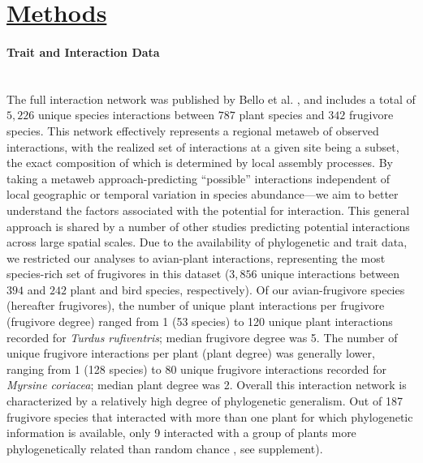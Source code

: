 \section*{\textbf{\underline{Methods}}}

\paragraph*{Trait and Interaction Data}\mbox{}\\
The full interaction network was published by Bello et al. \parencite{bello2017}, and includes a total of $5,226$ unique species interactions between $787$ plant species and $342$ frugivore species. This network effectively represents a regional metaweb of observed interactions, with the realized set of interactions at a given site being a subset, the exact composition of which is determined by local assembly processes. By taking a metaweb approach-predicting “possible” interactions independent of local geographic or temporal variation in species abundance—we aim to better understand the factors associated with the potential for interaction. This general approach is shared by a number of other studies predicting potential interactions across large spatial scales. \parencite{strydom2022food, dansereau2024spatially, hao2025global} Due to the availability of phylogenetic and trait data, we restricted our analyses to avian-plant interactions, representing the most species-rich set of frugivores in this dataset ($3,856$ unique interactions between $394$ 	and $242$ plant and bird species, respectively). Of our avian-frugivore species (hereafter frugivores), the number of unique plant interactions per frugivore (frugivore degree) ranged from 1 (53 species) to 120 unique plant interactions recorded for \emph{Turdus rufiventris}; median frugivore degree was 5. The number of unique frugivore interactions per plant (plant degree) was generally lower, ranging from 1 (128 species) to 80 unique frugivore interactions recorded for \emph{Myrsine coriacea}; median plant degree was 2. Overall this interaction network is characterized by a relatively high degree of phylogenetic generalism. Out of 187 frugivore species that interacted with more than one plant for which phylogenetic information is available, only 9 interacted with a group of plants more phylogenetically related than random chance \parencite{kembel2010picante}, see supplement). 

